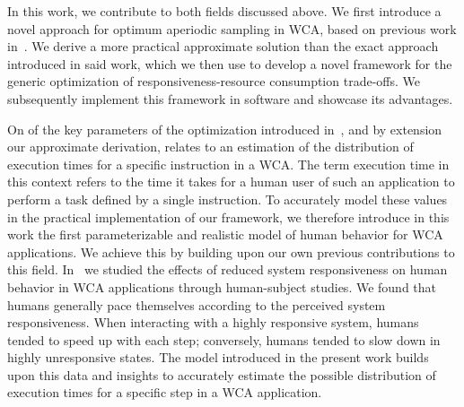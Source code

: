 \medskip


In this work, we contribute to both fields discussed above.
We first introduce a novel approach for optimum aperiodic sampling in \gls{WCA}, based on previous work in~\cite{moothedath2022energy2}.
We derive a more practical approximate solution than the exact approach introduced in said work, which we then use to develop a novel framework for the generic optimization of responsiveness-resource consumption trade-offs.
We subsequently implement this framework in software and showcase its advantages.

On of the key parameters of the optimization introduced in~\cite{moothedath2022energy2}, and by extension our approximate derivation, relates to an estimation of the distribution of execution times for a specific instruction in a \gls{WCA}.
The term execution time in this context refers to the time it takes for a human user of such an application to perform a task defined by a single instruction.
To accurately model these values in the practical implementation of our framework, we therefore introduce in this work the first parameterizable and realistic model of human behavior for \gls{WCA} applications.
We achieve this by building upon our own previous contributions to this field.
In~\cite{olguinmunoz2021impact} we studied the effects of reduced system responsiveness on human behavior in \gls{WCA} applications through human-subject studies.
We found that humans generally pace themselves according to the perceived system responsiveness.
When interacting with a highly responsive system, humans tended to speed up with each step; conversely, humans tended to slow down in highly unresponsive states.
The model introduced in the present work builds upon this data and insights to accurately estimate the possible distribution of execution times for a specific step in a \gls{WCA} application.


